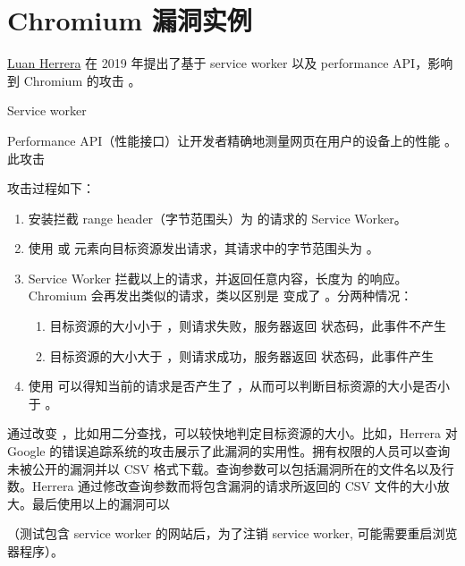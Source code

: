 \section{Chromium 漏洞实例}

\href{https://blog.lbherrera.me/}{Luan Herrera} 在 2019 年提出了基于 service worker 以及 performance API，影响到 Chromium 的攻击 \cite{herrera}。

Service worker

Performance API（性能接口）让开发者精确地测量网页在用户的设备上的性能 \cite{papi}。此攻击



攻击过程如下：

\begin{enumerate}
    \item 安装拦截 range header（字节范围头）为  的请求的 Service Worker。
    \item 使用  或  元素向目标资源发出请求，其请求中的字节范围头为 。
    \item Service Worker 拦截以上的请求，并返回任意内容，长度为  的响应。Chromium 会再发出类似的请求，类以区别是  变成了 。分两种情况：
    \begin{enumerate}
        \item 目标资源的大小小于 ，则请求失败，服务器返回  状态码，此事件不产生 
        \item 目标资源的大小大于 ，则请求成功，服务器返回  状态码，此事件产生 
    \end{enumerate}
    \item 使用  可以得知当前的请求是否产生了 ，从而可以判断目标资源的大小是否小于 。
\end{enumerate}

通过改变 ，比如用二分查找，可以较快地判定目标资源的大小。比如，Herrera 对 Google 的错误追踪系统的攻击展示了此漏洞的实用性。拥有权限的人员可以查询未被公开的漏洞并以 CSV 格式下载。查询参数可以包括漏洞所在的文件名以及行数。Herrera 通过修改查询参数而将包含漏洞的请求所返回的 CSV 文件的大小放大。最后使用以上的漏洞可以

（测试包含 service worker 的网站后，为了注销 service worker, 可能需要重启浏览器程序）。

